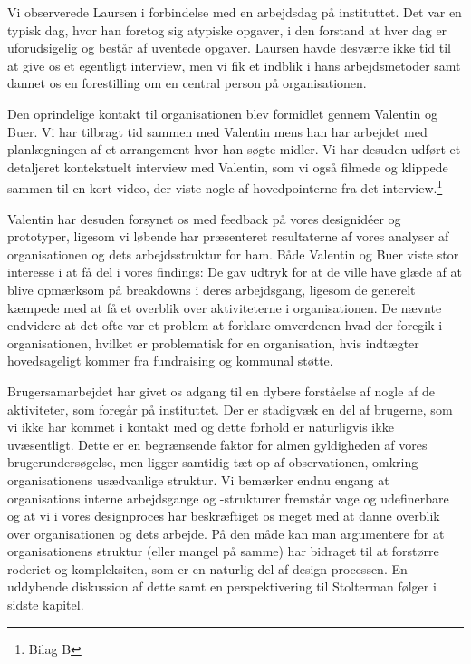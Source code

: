 Vi observerede Laursen i forbindelse med en arbejdsdag på instituttet. Det var en typisk dag, hvor han foretog sig atypiske opgaver, i den forstand at hver dag er uforudsigelig og består af uventede opgaver. Laursen havde desværre ikke tid til at give os et egentligt interview, men vi fik et indblik i hans arbejdsmetoder samt dannet os en forestilling om en central person på organisationen.

Den oprindelige kontakt til organisationen blev formidlet gennem Valentin og Buer. Vi har tilbragt tid sammen med Valentin mens han har arbejdet med planlægningen af et arrangement hvor han søgte midler. Vi har desuden udført et detaljeret kontekstuelt interview med Valentin, som vi også filmede og klippede sammen til en kort video, der viste nogle af hovedpointerne fra det interview.\footnote{Bilag B}

Valentin har desuden forsynet os med feedback på vores designidéer og prototyper, ligesom vi løbende har præsenteret resultaterne af vores analyser af organisationen og dets arbejdsstruktur for ham. Både Valentin og Buer viste stor interesse i at få del i vores findings: De gav udtryk for at de ville have glæde af at blive opmærksom på breakdowns i deres arbejdsgang, ligesom de generelt kæmpede med at få et overblik over aktiviteterne i organisationen. De nævnte endvidere at det ofte var et problem at forklare omverdenen hvad der foregik i organisationen, hvilket er problematisk for en organisation, hvis indtægter hovedsageligt kommer fra fundraising og kommunal støtte.

Brugersamarbejdet har givet os adgang til en dybere forståelse af nogle af de aktiviteter, som foregår på instituttet. Der er stadigvæk en del af brugerne, som vi ikke har kommet i kontakt med og dette forhold er naturligvis ikke uvæsentligt. Dette er en begrænsende faktor for almen gyldigheden af vores brugerundersøgelse, men ligger samtidig tæt op af observationen, omkring organisationens usædvanlige struktur. Vi bemærker endnu engang at organisations interne arbejdsgange og -strukturer fremstår vage og udefinerbare og at vi i vores designproces har beskræftiget os meget med at danne overblik over organisationen og dets arbejde. På den måde kan man argumentere for at organisationens struktur (eller mangel på samme) har bidraget til at forstørre roderiet og kompleksiten, som er en naturlig del af design processen. En uddybende diskussion af dette samt en perspektivering til Stolterman følger i sidste kapitel.

